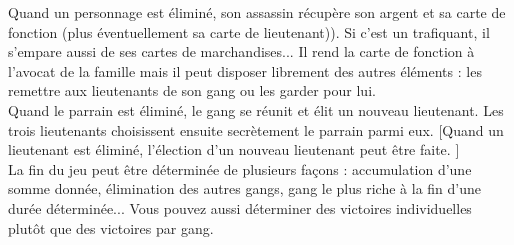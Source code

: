 \documentclass[11pt,twoside,a4paper]{article}
\begin{document}
\begin{multicols*}{2}
Quand un personnage est {\'e}limin{\'e}, son assassin r{\'e}cup{\`e}re son argent et sa carte de fonction (plus {\'e}ventuellement sa carte de lieutenant)). Si c'est un trafiquant, il s'empare aussi de ses cartes de marchandises... Il rend la carte de fonction {\`a} l'avocat de la famille mais il peut disposer librement des autres {\'e}l{\'e}ments : les remettre aux lieutenants de son gang ou les garder pour lui. ~\\

Quand le parrain est {\'e}limin{\'e}, le gang se r{\'e}unit et {\'e}lit un nouveau lieutenant. Les trois lieutenants choisissent ensuite secr{\`e}tement le parrain parmi eux. [Quand un lieutenant est {\'e}limin{\'e}, l'{\'e}lection d'un nouveau lieutenant peut {\^e}tre faite. ]~\\

La fin du jeu peut {\^e}tre d{\'e}termin{\'e}e de plusieurs fa\c{c}ons : accumulation d'une somme donn{\'e}e, {\'e}limination des autres gangs, gang le plus riche {\`a} la fin d'une dur{\'e}e d{\'e}termin{\'e}e... Vous pouvez aussi d{\'e}terminer des victoires individuelles plut{\^o}t que des victoires par gang. ~\\

\end{multicols*}

\end{document}
